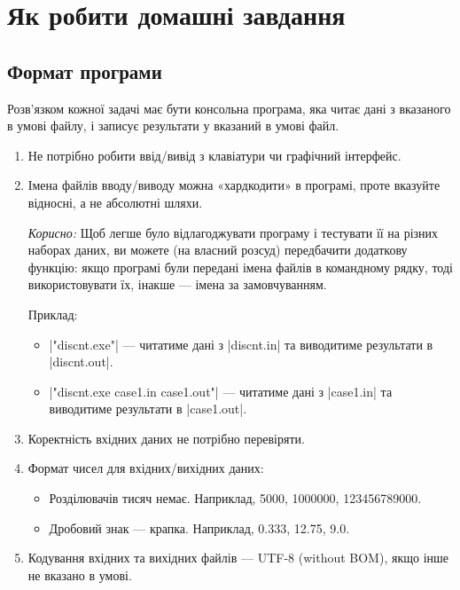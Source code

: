 \documentclass[12pt,a4paper]{article}
\begin{document}
\section*{Як робити домашні завдання}


\subsection*{Формат програми}

Розв'язком кожної задачі має бути консольна програма, яка читає дані з вказаного в умові файлу, і записує результати у вказаний в умові файл.

\begin{enumerate}
    \item Не потрібно робити ввід/вивід з клавіатури чи графічний інтерфейс.
    \item Імена файлів вводу/виводу можна «хардкодити» в програмі, проте вказуйте відносні, а не абсолютні шляхи.

        \vspace{0.5em}
        \emph{Корисно:} Щоб легше було відлагоджувати програму і тестувати її на різних наборах даних, ви можете (на власний розсуд) передбачити додаткову функцію: якщо програмі були передані імена файлів в командному рядку, тоді використовувати їх, інакше --- імена за замовчуванням.

        \vspace{0.5em}
        Приклад:
        \begin{itemize}
            \item |"discnt.exe"| --- читатиме дані з |discnt.in| та виводитиме результати в |discnt.out|.
            \item |"discnt.exe case1.in case1.out"| --- читатиме дані з |case1.in| та виводитиме результати в |case1.out|.
        \end{itemize}

    \item Коректність вхідних даних не потрібно перевіряти.
    \item Формат чисел для вхідних/вихідних даних:
        \begin{itemize}
            \item Розділювачів тисяч немає. Наприклад, 5000, 1000000, 123456789000.
            \item Дробовий знак --- крапка. Наприклад, 0.333, 12.75, 9.0.
        \end{itemize}

    \item Кодування вхідних та вихідних файлів --- UTF-8 (without BOM), якщо інше не вказано в умові.
\end{enumerate}
\end{document}
